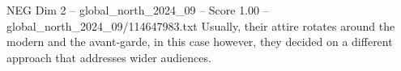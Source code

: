 \begin{textsample}{NEG Dim 2 – global\_north\_2024\_09 – Score 1.00 – global\_north\_2024\_09/114647983.txt}
Usually, their attire rotates around the modern and the avant-garde, in this case however, they decided on a different approach that addresses wider audiences.

\end{textsample}
